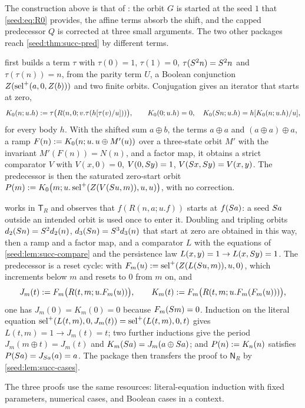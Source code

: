\begin{remark}\label{seed:rem:succ-three}
The construction above is that of : the
orbit $G$ is started at the seed $1$ that \eqref{seed:eq:R0} provides, the
affine terms absorb the shift, and the capped predecessor $Q$ is corrected at
three small arguments. The two other packages reach \cref{seed:thm:succ-pred}
by different terms.

 first builds a term $\tau$ with $\tau(0)=1$,
$\tau(1)=0$, $\tau(S^2n)=S^2n$ and $\tau(\tau(n))=n$, from the parity
term $U$, a Boolean conjunction $Z(\operatorname{sel}^{+}(a,0,Z(b)))$ and two finite orbits.
Conjugation gives an iterator that starts at zero,
\[
 K_0(n;u.h)\mathrel{:=}\tau\bigl(R(n,0;v.\tau(h[\tau(v)/u]))\bigr),\qquad
 K_0(0;u.h)=0,\quad K_0(S n;u.h)=h[K_0(n;u.h)/u],
\]
for every body $h$. With the shifted sum $a\oplus b$, the terms
$a\oplus a$ and $(a\oplus a)\oplus a$, a ramp $F(n)\mathrel{:=}
K_0(n;u.\,u\oplus M'(u))$ over a three-state orbit $M'$ with the invariant
$M'(F(n))=N(n)$, and a factor map, it obtains a strict comparator $V$ with
$V(x,0)=0$, $V(0,S y)=1$, $V(S x,S y)=V(x,y)$. The predecessor is
then the saturated zero-start orbit
$P(m)\mathrel{:=} K_0\bigl(m;u.\operatorname{sel}^{+}(Z(V(S u,m)),u,u)\bigr)$, with no
correction.

 works in $\mathsf{T}_R$ and observes that
$f(R(n,a;u.f))$ starts at $f(S a)$: a seed $S a$ outside an intended
orbit is used once to enter it. Doubling and tripling orbits
$d_2(S n)=S^2d_2(n)$, $d_3(S n)=S^3d_3(n)$ that start at zero are
obtained in this way, then a ramp and a factor map, and a comparator $L$ with
the equations of \cref{seed:lem:succ-compare} and the persistence law
$L(x,y)=1\to L(x,S y)=1$. The predecessor is a reset cycle: with
$F_m(u)\mathrel{:=}\operatorname{sel}^{+}(Z(L(S u,m)),u,0)$, which increments below $m$ and
resets to $0$ from $m$ on, and
\[
 J_m(t)\mathrel{:=} F_m\bigl(R(t,m;u.F_m(u))\bigr),\qquad
 K_m(t)\mathrel{:=} F_m\bigl(R(t,m;u.F_m(F_m(u)))\bigr),
\]
one has $J_m(0)=K_m(0)=0$ because $F_m(S m)=0$. Induction on the literal
equation $\operatorname{sel}^{+}(L(t,m),0,J_m(t))=\operatorname{sel}^{+}(L(t,m),0,t)$ gives
$L(t,m)=1\to J_m(t)=t$; two further inductions give the period
$J_m(m\oplus t)=J_m(t)$ and $K_m(S a)=J_m(a\oplus S a)$; and
$P(n)\mathrel{:=} K_n(n)$ satisfies $P(S a)=J_{S a}(a)=a$. The package then
transfers the proof to $\mathsf{N}_R$ by
\cref{seed:lem:succ-cases}.

The three proofs use the same resources: literal-equation induction with
fixed parameters, numerical cases, and Boolean cases in a context.
\end{remark}


